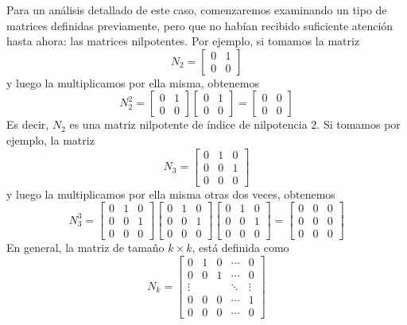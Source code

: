 Para un análisis detallado de este caso, comenzaremos examinando un tipo de matrices definidas previamente, pero que no habían recibido suficiente atención hasta ahora: las matrices nilpotentes. Por ejemplo, si tomamos la matriz
$$N_2 = \begin{bmatrix}
    0 & 1 \\
    0 & 0
\end{bmatrix}$$
y luego la multiplicamos por ella misma, obtenemos
$$N_2^2 = \begin{bmatrix}
    0 & 1 \\
    0 & 0
\end{bmatrix}\begin{bmatrix}
    0 & 1 \\
    0 & 0
\end{bmatrix} = \begin{bmatrix}
    0 & 0 \\
    0 & 0
\end{bmatrix}$$
Es decir, $N_2$ es una matriz nilpotente de índice de nilpotencia $2$. Si tomamos por ejemplo, la matriz
$$N_3 = \begin{bmatrix}
    0 & 1 & 0 \\
    0 & 0 & 1 \\
    0 & 0 & 0
\end{bmatrix}$$
y luego la multiplicamos por ella misma otras dos veces, obtenemos
$$N_3^3 = \begin{bmatrix}
    0 & 1 & 0 \\
    0 & 0 & 1 \\
    0 & 0 & 0
\end{bmatrix}\begin{bmatrix}
    0 & 1 & 0 \\
    0 & 0 & 1 \\
    0 & 0 & 0
\end{bmatrix}\begin{bmatrix}
    0 & 1 & 0 \\
    0 & 0 & 1 \\
    0 & 0 & 0
\end{bmatrix} = \begin{bmatrix}
    0 & 0 & 0 \\
    0 & 0 & 0 \\
    0 & 0 & 0
\end{bmatrix}$$\newpage\noindent
En general, la matriz de tamaño $k \times k$, está definida como
$$N_k = \begin{bmatrix}
    0 & 1 & 0 & \cdots & 0 \\
    0 & 0 & 1 & \cdots & 0 \\
    \vdots & & & \ddots & \vdots \\
    0 & 0 & 0 & \cdots & 1 \\
    0 & 0 & 0 & \cdots & 0
\end{bmatrix}$$
